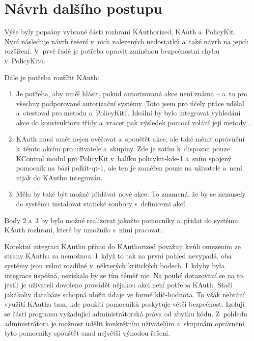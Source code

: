\section{Návrh dalšího postupu}
Výše byly popsány vybrané části rozhraní KAuthorized, KAuth a~PolicyKit. Nyní následuje návrh řešení v~nich nalezených nedostatků a~také návrh na jejich rozšíření. V~prvé řadě je potřeba opravit zmíněnou bezpečnostní chybu v~PolicyKitu.

Dále je potřeba rozšířit KAuth:
\begin{enumerate}
\item Je potřeba, aby uměl hlásit, pokud autorizovaná akce není známa -- a~to pro všechny podporované autorizační systémy. Toto jsem pro účely práce udělal a~otestoval pro metodu  a~PolicyKit1. Ideální by bylo integrovat vyhledání akce do konstruktoru třídy  a~vracet pak výsledek pomocí volání její metody .
\item KAuth musí umět nejen ověřovat a~spouštět akce, ale také měnit oprávnění k~těmto akcím pro uživatele a~skupiny. Zde je zatím k~dispozici pouze KControl modul pro PolicyKit v~balíku policykit-kde-1 a~sním spojený pomocník na bázi polkit-qt-1, ale ten je zaměřen pouze na uživatele a~není nijak do KAuthu integrován.
\item Mělo by také být možné přidávat nové akce. To znamená, že by se nemusely do systému instalovat statické soubory s~definicemi akcí.
\end{enumerate}

Body 2 a~3 by bylo možné realizovat jakožto pomocníky a~přidat do systému KAuth rozhraní, které by umožnilo s~nimi pracovat.

Korektní integraci KAuthu přímo do KAuthorized považuji kvůli omezením ze strany KAuthu za nemožnou. I~když to tak na první pohled nevypadá, oba systémy jsou velmi rozdílné v~některých kritických bodech. I~kdyby byla integrace úspěšná, nezískalo by se tím téměř nic. Na pouhé dotazování se na to, jestli je uživateli dovoleno provádět nějakou akci není potřeba KAuth. Stačí jakákoliv databáze schopná uložit údaje ve formě klíč-hodnota. To však nebrání využití KAuthu tam, kde použití pomocníků poskytuje větší bezpečnost. Izolují se části programu vyžadující administrátorská práva od zbytku kódu. Z~pohledu administrátora je možnost udělit konkrétním uživatelům a~skupinám oprávnění tyto pomocníky spouštět snad největší výhodou řešení.

